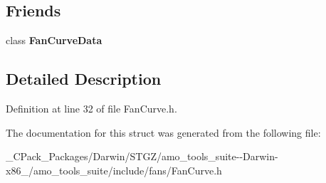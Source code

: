 \subsection*{Friends}
\begin{DoxyCompactItemize}
\item 
\mbox{\label{struct_fan_curve_data_1_1_base_curve_a6c0df668730aa3a6673d279f2bbe7799}} 
class {\bfseries Fan\+Curve\+Data}
\end{DoxyCompactItemize}


\subsection{Detailed Description}


Definition at line 32 of file Fan\+Curve.\+h.



The documentation for this struct was generated from the following file\+:\begin{DoxyCompactItemize}
\item 
\+\_\+\+C\+Pack\+\_\+\+Packages/\+Darwin/\+S\+T\+G\+Z/amo\+\_\+tools\+\_\+suite-\/-\/\+Darwin-\/x86\+\_/amo\+\_\+tools\+\_\+suite/include/fans/Fan\+Curve.\+h\end{DoxyCompactItemize}
